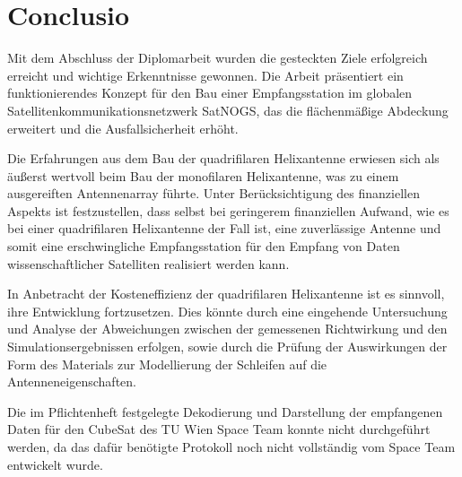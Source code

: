 \chapter{Conclusio}

Mit dem Abschluss der Diplomarbeit wurden die gesteckten Ziele erfolgreich erreicht und wichtige Erkenntnisse gewonnen. Die Arbeit präsentiert ein funktionierendes Konzept für den Bau einer Empfangsstation im globalen Satellitenkommunikationsnetzwerk SatNOGS, das die flächenmäßige Abdeckung erweitert und die Ausfallsicherheit erhöht.

Die Erfahrungen aus dem Bau der quadrifilaren Helixantenne erwiesen sich als äußerst wertvoll beim Bau der monofilaren Helixantenne, was zu einem ausgereiften Antennenarray führte. Unter Berücksichtigung des finanziellen Aspekts ist festzustellen, dass selbst bei geringerem finanziellen Aufwand, wie es bei einer quadrifilaren Helixantenne der Fall ist, eine zuverlässige Antenne und somit eine erschwingliche Empfangsstation für den Empfang von Daten wissenschaftlicher Satelliten realisiert werden kann.

In Anbetracht der Kosteneffizienz der quadrifilaren Helixantenne ist es sinnvoll, ihre Entwicklung fortzusetzen. Dies könnte durch eine eingehende Untersuchung und Analyse der Abweichungen zwischen der gemessenen Richtwirkung und den Simulationsergebnissen erfolgen, sowie durch die Prüfung der Auswirkungen der Form des Materials zur Modellierung der Schleifen auf die Antenneneigenschaften.

Die im Pflichtenheft festgelegte Dekodierung und Darstellung der empfangenen Daten für den CubeSat des TU Wien Space Team konnte nicht durchgeführt werden, da das dafür benötigte Protokoll noch nicht vollständig vom Space Team entwickelt wurde.